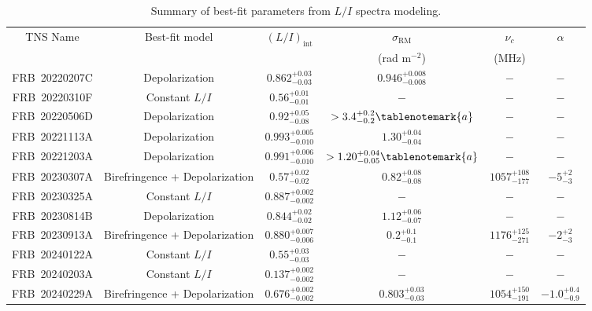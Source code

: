 \documentclass[twocolumn, linenumbers]{aastex701}
\begin{document}
\setlength{\tabcolsep}{12.6pt}
\setlength\extrarowheight{2pt}
\setlength{\LTcapwidth}{1.0\textwidth}
\begin{table}[t!]
\begin{center}
\caption{Summary of best-fit parameters from $L/I$ spectra modeling.} \label{tb:model_params}
\begin{tabular}{cccccc}
\hline
\hline
TNS Name & Best-fit model & $(L/I)_\mathrm{int}$ & $\sigma_\mathrm{RM}$ & $\nu_c$ & $\alpha$\\
 &  &  & (rad m$^{-2}$) & (MHz) & \\
\hline
FRB~20220207C & Depolarization & $0.862^{+0.03}_{-0.03}$ & $0.946^{+0.008}_{-0.008}$ & $-$ & $-$\\
FRB~20220310F & Constant $L/I$ & $0.56^{+0.01}_{-0.01}$ & $-$ & $-$ & $-$\\
FRB~20220506D & Depolarization & $0.92^{+0.05}_{-0.08}$ & $>3.4^{+0.2}_{-0.2}\tablenotemark{a}$ & $-$ & $-$\\
FRB~20221113A & Depolarization & $0.993^{+0.005}_{-0.010}$ & $1.30^{+0.04}_{-0.04}$ & $-$ & $-$\\
FRB~20221203A & Depolarization & $0.991^{+0.006}_{-0.010}$ & $>1.20^{+0.04}_{-0.05}\tablenotemark{a}$ & $-$ & $-$\\
FRB~20230307A & Birefringence + Depolarization & $0.57^{+0.02}_{-0.02}$ & $0.82^{+0.08}_{-0.08}$ & $1057^{+108}_{-177}$ & $-5^{+2}_{-3}$\\
FRB~20230325A & Constant $L/I$ & $0.887^{+0.002}_{-0.002}$ & $-$ & $-$ & $-$\\
FRB~20230814B & Depolarization & $0.844^{+0.02}_{-0.02}$ & $1.12^{+0.06}_{-0.07}$ & $-$ & $-$\\
FRB~20230913A & Birefringence + Depolarization & $0.880^{+0.007}_{-0.006}$ & $0.2^{+0.1}_{-0.1}$ & $1176^{+125}_{-271}$ & $-2^{+2}_{-3}$\\
FRB~20240122A & Constant $L/I$ & $0.55^{+0.03}_{-0.03}$ & $-$ & $-$ & $-$\\
FRB~20240203A & Constant $L/I$ & $0.137^{+0.002}_{-0.002}$ & $-$ & $-$ & $-$\\
FRB~20240229A & Birefringence + Depolarization & $0.676^{+0.002}_{-0.002}$ & $0.803^{+0.03}_{-0.03}$ & $1054^{+150}_{-191}$ & $-1.0^{+0.4}_{-0.9}$\\
\hline
\hline
\end{tabular}
\end{center}
\end{table}
\end{document}
